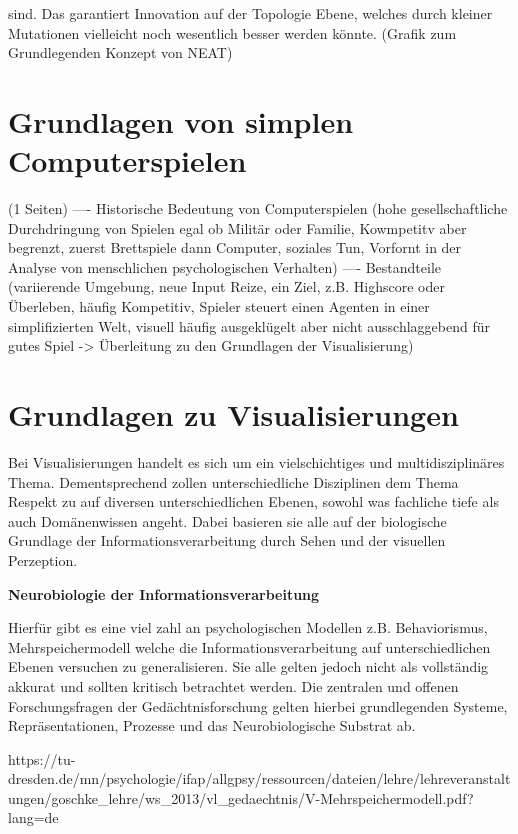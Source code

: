 sind. Das garantiert Innovation auf der Topologie Ebene, welches durch kleiner Mutationen vielleicht noch wesentlich besser werden könnte. (Grafik zum Grundlegenden Konzept von NEAT)

\section{Grundlagen von simplen Computerspielen}
(1 Seiten)
---- Historische Bedeutung von Computerspielen (hohe gesellschaftliche Durchdringung von Spielen egal ob Militär oder Familie, Kowmpetitv aber begrenzt, zuerst Brettspiele dann Computer, soziales Tun, Vorfornt in der Analyse von menschlichen psychologischen Verhalten)
---- Bestandteile (variierende Umgebung, neue Input Reize, ein Ziel, z.B. Highscore oder Überleben, häufig Kompetitiv, Spieler steuert einen Agenten in einer simplifizierten Welt, visuell häufig ausgeklügelt aber nicht ausschlaggebend für gutes Spiel -> Überleitung zu den Grundlagen der Visualisierung)

\section{Grundlagen zu Visualisierungen}

Bei Visualisierungen handelt es sich um ein vielschichtiges und multidisziplinäres Thema. Dementsprechend zollen unterschiedliche Disziplinen dem Thema Respekt zu auf diversen unterschiedlichen Ebenen, sowohl was fachliche tiefe als auch Domänenwissen angeht. Dabei basieren sie alle auf der biologische Grundlage der Informationsverarbeitung durch Sehen und der visuellen Perzeption. 

\textbf{Neurobiologie der Informationsverarbeitung}

Hierfür gibt es eine viel zahl an psychologischen Modellen z.B. Behaviorismus, Mehrspeichermodell welche die Informationsverarbeitung auf unterschiedlichen Ebenen versuchen zu generalisieren.  Sie alle gelten jedoch nicht als vollständig akkurat und sollten kritisch betrachtet werden. \cite{TUD-V1} Die zentralen und offenen Forschungsfragen der Gedächtnisforschung gelten hierbei grundlegenden Systeme, Repräsentationen, Prozesse und das Neurobiologische Substrat ab. \cite[S. 69]{TUD-VL01}

https://tu-dresden.de/mn/psychologie/ifap/allgpsy/ressourcen/dateien/lehre/lehreveranstaltungen/goschke\_lehre/ws\_2013/vl\_gedaechtnis/V-Mehrspeichermodell.pdf?lang=de

